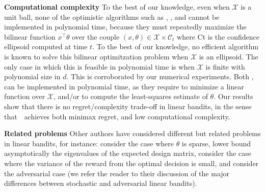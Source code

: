 \textbf{Computational complexity} To the best of our knowledge, even when $\mathcal{X}$ is a unit ball, none of the optimistic algorithms such as , ,  and  cannot be implemented in polynomial time, because they must repeatedly maximize the bilinear function $x^\top \theta$ over the couple  $(x,\theta) \in \mathcal{X} \times \mathcal{C}_t$ where \gls{Ct} is the confidence ellipsoid computed at time $t$. 
To the best of our knowledge, no efficient algorithm is known to solve this bilinear optimitzation problem when $\mathcal{X}$ is an ellipsoid. 
The only case in which this is feasible in polynomial time is when $\mathcal{X}$ is finite with polynomial size in $d$. 
This is corroborated by our numerical experiments. 
Both ,  can be implemented in polynomial time, as they require to minimize a linear function over $\mathcal{X}$, and/or to compute the least-squares estimate of $\theta$. 
Our results show that there is no regret/complexity trade-off in linear bandits, in the sense that~\nous~achieves both minimax regret, and low computational complexity.  

\textbf{Related problems} 
Other authors have considered different but related problems in linear bandits, for
instance: \cite{zhu2022pareto} consider the case where $\theta$ is sparse,
\citet{banerjee2022exploration} lower bound asymptotically the eigenvalues of the
expected design matrix, \cite{jun2024noise} consider the case where the variance of the
reward from the optimal decision is small, and \cite{lattimore_bandit_2020} consider
the adversarial case (we refer the reader to their discussion of the major differences
between stochastic and adversarial linear bandits).